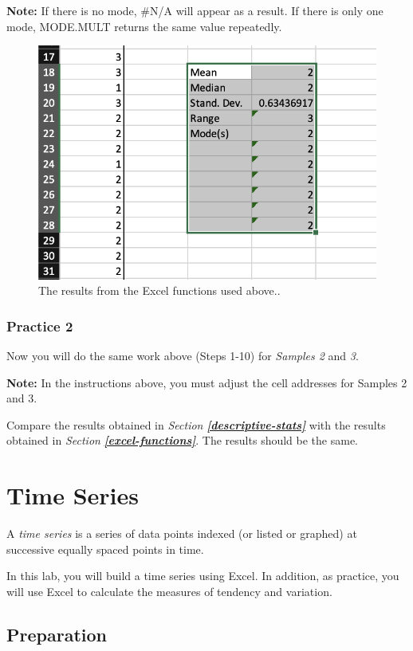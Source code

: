 \documentclass[
  12pt,
  letterpaper,
]{book}
\begin{document}
\textbf{Note:} If there is no mode, \#N/A will appear as a result. If there is only one mode, MODE.MULT returns the same value repeatedly.

\begin{figure}

{\centering \includegraphics[width=0.6\linewidth]{images/excel-functions} 

}

\caption{The results from the Excel functions used above..}\label{fig:excel-functions}
\end{figure}

\hypertarget{practice-2-2}{%
\subsection{Practice 2}\label{practice-2-2}}

Now you will do the same work above (Steps 1-10) for \emph{Samples 2} and \emph{3}.

\textbf{Note:} In the instructions above, you must adjust the cell addresses for Samples 2 and 3.

Compare the results obtained in \emph{Section} \textbf{\emph{\ref{descriptive-stats}}} with the results obtained in \emph{Section} \textbf{\emph{\ref{excel-functions}}}. The results should be the same.

\hypertarget{time-series}{%
\chapter{Time Series}\label{time-series}}

A \emph{time series} is a series of data points indexed (or listed or graphed) at successive equally spaced points in time.

In this lab, you will build a time series using Excel. In addition, as practice, you will use Excel to calculate the measures of tendency and variation.

\hypertarget{preparation-2}{%
\section{Preparation}\label{preparation-2}}
\end{document}
